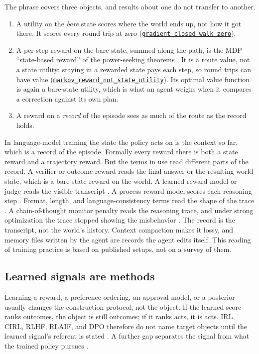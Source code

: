 \documentclass[11pt]{article}
\newcommand{\lean}[1]{\hyperref[lean:#1]{\nolinkurl{#1}}}
\begin{document}
The phrase covers three objects, and results about one do not transfer to another.
\begin{enumerate}[leftmargin=1.5em]
  \item A utility on the \emph{bare} state scores where the world ends up, not how it got there.
  It scores every round trip at zero (\lean{gradient_closed_walk_zero}).
  \item A per-step reward on the bare state, summed along the path, is the MDP ``state-based reward'' of the power-seeking theorems \parencite{turner2021seekpower}.
  It is a route value, not a state utility: staying in a rewarded state pays each step, so round trips can have value (\lean{markov_reward_not_state_utility}).
  Its optimal value function is again a bare-state utility, which is what an agent weighs when it compares a correction against its own plan.
  \item A reward on a \emph{record} of the episode sees as much of the route as the record holds.
\end{enumerate}
In language-model training the state the policy acts on is the context so far, which is a record of the episode.
Formally every reward there is both a state reward and a trajectory reward.
But the terms in use read different parts of the record.
A verifier or outcome reward reads the final answer or the resulting world state, which is a bare-state reward on the world.
A learned reward model or judge reads the visible transcript \parencite{ouyang2022instructgpt}.
A process reward model scores each reasoning step \parencite{lightman2023verify}.
Format, length, and language-consistency terms read the shape of the trace \parencite{deepseek2025r1}.
A chain-of-thought monitor penalty reads the reasoning trace, and under strong optimization the trace stopped showing the misbehavior \parencite{baker2025monitoring}.
The record is the transcript, not the world's history.
Context compaction makes it lossy, and memory files written by the agent are records the agent edits itself.
This reading of training practice is based on published setups, not on a survey of them.

\subsection{Learned signals are methods}

Learning a reward, a preference ordering, an approval model, or a posterior usually changes the construction protocol, not the object.
If the learned score ranks outcomes, the object is still outcomes; if it ranks acts, it is acts.
IRL, CIRL, RLHF, RLAIF, and DPO therefore do not name target objects until the learned signal's referent is stated \parencite{ng2000irl,hadfieldmenell2016,christiano2017,bai2022rlaif,rafailov2023}.
A further gap separates the signal from what the trained policy pursues \parencite{turner2022rewardnotopt}.
\end{document}
